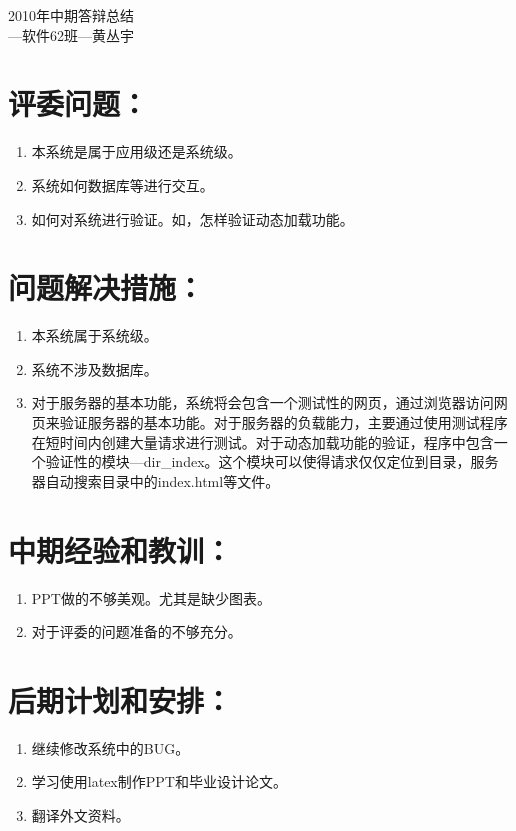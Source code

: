 \documentclass[12pt, a4paper]{article}
\begin{document}
\begin{center}
{\Huge 2010年中期答辩总结}\\
{\Large ---软件62班---黄丛宇}
\end{center}

\section{评委问题：}
\begin{enumerate}[1)]
	\item 本系统是属于应用级还是系统级。
	\item 系统如何数据库等进行交互。
	\item 如何对系统进行验证。如，怎样验证动态加载功能。
\end{enumerate}

\section{问题解决措施：}
\begin{enumerate}[1)]
	\item 本系统属于系统级。
	\item 系统不涉及数据库。
	\item 对于服务器的基本功能，系统将会包含一个测试性的网页，通过浏览器访问网页来验证服务器的基本功能。对于服务器的负载能力，主要通过使用测试程序在短时间内创建大量请求进行测试。对于动态加载功能的验证，程序中包含一个验证性的模块---dir\_index。这个模块可以使得请求仅仅定位到目录，服务器自动搜索目录中的index.html等文件。
\end{enumerate}

\section{中期经验和教训：}
\begin{enumerate}[1)]
	\item PPT做的不够美观。尤其是缺少图表。
	\item 对于评委的问题准备的不够充分。
	
\end{enumerate}

\section{后期计划和安排：}
\begin{enumerate}[1)]
	\item 继续修改系统中的BUG。
	\item 学习使用latex制作PPT和毕业设计论文。
	\item 翻译外文资料。
\end{enumerate}
\end{document}
